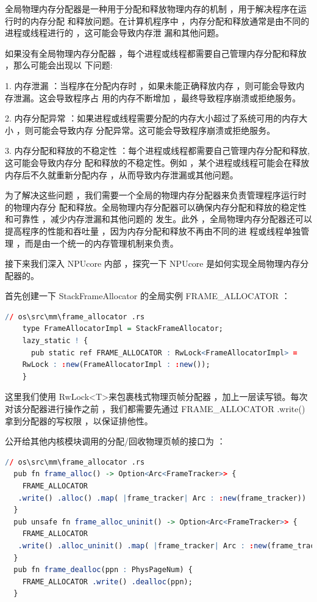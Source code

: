 \documentclass[12pt, a4paper]{ctexart}
\begin{document}
	全局物理内存分配器是一种用于分配和释放物理内存的机制 ，用于解决程序在运行时的内存分配 和释放问题。在计算机程序中 ，内存分配和释放通常是由不同的进程或线程进行的 ，这可能会导致内存泄 漏和其他问题。
	
	如果没有全局物理内存分配器 ，每个进程或线程都需要自己管理内存分配和释放 ，那么可能会出现以 下问题:
	
	1. 内存泄漏 ：当程序在分配内存时 ，如果未能正确释放内存 ，则可能会导致内存泄漏。这会导致程序占 用的内存不断增加 ，最终导致程序崩溃或拒绝服务。
	
	2. 内存分配异常 ：如果进程或线程需要分配的内存大小超过了系统可用的内存大小 ，则可能会导致内存 分配异常。这可能会导致程序崩溃或拒绝服务。
	
	3. 内存分配和释放的不稳定性 ：每个进程或线程都需要自己管理内存分配和释放,这可能会导致内存分 配和释放的不稳定性。例如 ，某个进程或线程可能会在释放内存后不久就重新分配内存 ，从而导致内存泄漏或其他问题。
	
	为了解决这些问题 ，我们需要一个全局的物理内存分配器来负责管理程序运行时的物理内存分 配和释放。全局物理内存分配器可以确保内存分配和释放的稳定性和可靠性 ，减少内存泄漏和其他问题的 发生。此外 ，全局物理内存分配器还可以提高程序的性能和吞吐量 ，因为内存分配和释放不再由不同的进 程或线程单独管理 ，而是由一个统一的内存管理机制来负责。
	
	接下来我们深入 NPUcore 内部 ，探究一下 NPUcore 是如何实现全局物理内存分配器的。
	
	首先创建一下  StackFrameAllocator 的全局实例  FRAME\_ALLOCATOR  ：
\begin{lstlisting}[language=R]
  // os\src\mm\frame_allocator .rs
    type FrameAllocatorImpl = StackFrameAllocator;
    lazy_static ! {
      pub static ref FRAME_ALLOCATOR : RwLock<FrameAllocatorImpl> =
    RwLock : :new(FrameAllocatorImpl : :new());
    }
\end{lstlisting}

	这里我们使用  RwLock\textless T\textgreater 来包裹栈式物理页帧分配器 ，加上一层读写锁。每次对该分配器进行操作之前 ，我们都需要先通过  FRAME\_ALLOCATOR .write() 拿到分配器的写权限 ，以保证排他性。
	
	公开给其他内核模块调用的分配/回收物理页帧的接口为 ：
\begin{lstlisting}[language=R]
  // os\src\mm\frame_allocator .rs
  pub fn frame_alloc() -> Option<Arc<FrameTracker>> {
    FRAME_ALLOCATOR
   .write() .alloc() .map( |frame_tracker| Arc : :new(frame_tracker))
  }
  pub unsafe fn frame_alloc_uninit() -> Option<Arc<FrameTracker>> {
    FRAME_ALLOCATOR
   .write() .alloc_uninit() .map( |frame_tracker| Arc : :new(frame_tracker))
  }
  pub fn frame_dealloc(ppn : PhysPageNum) {
    FRAME_ALLOCATOR .write() .dealloc(ppn);
  }
\end{lstlisting}
\end{document}
